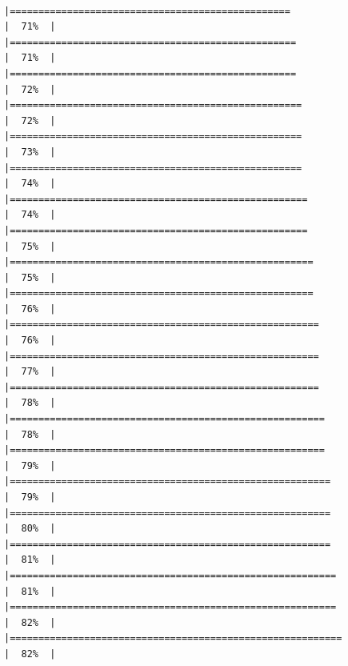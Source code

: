\documentclass[
  ignorenonframetext,
]{beamer}
\begin{document}
\begin{frame}[fragile]{}
\begin{verbatim}
                                                |=================================================                     |  71%  |                                                                              |==================================================                    |  71%  |                                                                              |==================================================                    |  72%  |                                                                              |===================================================                   |  72%  |                                                                              |===================================================                   |  73%  |                                                                              |===================================================                   |  74%  |                                                                              |====================================================                  |  74%  |                                                                              |====================================================                  |  75%  |                                                                              |=====================================================                 |  75%  |                                                                              |=====================================================                 |  76%  |                                                                              |======================================================                |  76%  |                                                                              |======================================================                |  77%  |                                                                              |======================================================                |  78%  |                                                                              |=======================================================               |  78%  |                                                                              |=======================================================               |  79%  |                                                                              |========================================================              |  79%  |                                                                              |========================================================              |  80%  |                                                                              |========================================================              |  81%  |                                                                              |=========================================================             |  81%  |                                                                              |=========================================================             |  82%  |                                                                              |==========================================================            |  82%  |      
\end{verbatim}
\end{frame}
\end{document}
